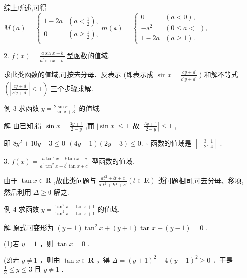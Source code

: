 \documentclass[10pt]{article}
\begin{document}
综上所述,可得 \(M\left( a\right)  = \left\{  {\begin{array}{ll} 1 - {2a} & \left( {a < \frac{1}{2}}\right) , \\  0 & \left( {a \geq  \frac{1}{2}}\right) , \end{array}m\left( a\right)  = \left\{  \begin{array}{ll} 0 & \left( {a < 0}\right) , \\   - {a}^{2} & \left( {0 \leq  a < 1}\right) , \\  1 - {2a} & \left( {a \geq  1}\right) . \end{array}\right. }\right.\)

2. \(f\left( x\right)  = \frac{a\sin x + b}{{a}^{\prime }\sin x + {b}^{\prime }}\) 型函数的值域.

求此类函数的值域,可按去分母、反表示 (即表示成 \(\sin x = \frac{{cy} + d}{{c}^{\prime }y + {d}^{\prime }}\) ) 和解不等式 \(\left( {\left| \frac{{cy} + d}{{c}^{\prime }y + {d}^{\prime }}\right|  \leq  1}\right)\) 三个步骤求解.

例 3 求函数 \(y = \frac{2\sin x - 1}{\sin x + 3}\) 的值域.

解 由已知,得 \(\sin x = \frac{{3y} + 1}{2 - y}\) ,而 \(\left| {\sin x}\right|  \leq  1\) ,故 \(\left| \frac{{3y} + 1}{2 - y}\right|  \leq  1\) ,

即 \(8{y}^{2} + {10y} - 3 \leq  0,\left( {{4y} - 1}\right) \left( {{2y} + 3}\right)  \leq  0.\;\therefore\) 函数的值域是 \(\left\lbrack  {-\frac{3}{2},\frac{1}{4}}\right\rbrack\) .

3. \(f\left( x\right)  = \frac{a{\tan }^{2}x + b\tan x + c}{{a}^{\prime }{\tan }^{2}x + {b}^{\prime }\tan x + {c}^{\prime }}\) 型函数的值域.

由于 \(\tan x \in  \mathbf{R}\) ,故此类问题与 \(\frac{a{t}^{2} + {bt} + c}{{a}^{\prime }{t}^{2} + {b}^{\prime }t + {c}^{\prime }}\left( {t \in  \mathbf{R}}\right)\) 类问题相同,可去分母、移项,然后利用 \(\Delta  \geq  0\) 解之.

例 4 求函数 \(y = \frac{{\tan }^{2}x - \tan x + 1}{{\tan }^{2}x + \tan x + 1}\) 的值域.

解 原式可变形为 \(\left( {y - 1}\right) {\tan }^{2}x + \left( {y + 1}\right) \tan x + \left( {y - 1}\right)  = 0\) .

(1)若 \(y = 1\) ，则 \(\tan x = 0\) .

(2)若 \(y \neq  1\) ，则由 \(\tan x \in  \mathbf{R}\) ，得 \(\Delta  = {\left( y + 1\right) }^{2} - 4{\left( y - 1\right) }^{2} \geq  0\) ，于是 \(\frac{1}{3} \leq  y \leq  3\) 且 \(y \neq  1\) .
\end{document}
